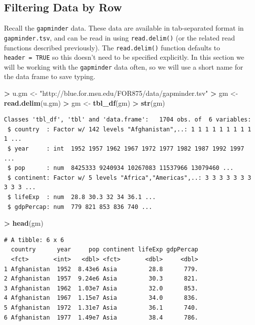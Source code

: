 \documentclass[]{krantz}
\makeatletter
\newenvironment{Shaded}{\begin{snugshade}}{\end{snugshade}}
\newcommand{\KeywordTok}[1]{\textcolor[rgb]{0.27,0.27,0.27}{\textbf{#1}}}
\newcommand{\NormalTok}[1]{#1}
\newcommand{\OperatorTok}[1]{\textcolor[rgb]{0.43,0.43,0.43}{\textbf{#1}}}
\newcommand{\StringTok}[1]{\textcolor[rgb]{0.5,0.5,0.5}{#1}}
\newenvironment{kframe}{%
\medskip{}
\setlength{\fboxsep}{.8em}
 \def\at@end@of@kframe{}%
 \ifinner\ifhmode%
  \def\at@end@of@kframe{\end{minipage}}%
  \begin{minipage}{\columnwidth}%
 \fi\fi%
 \def\FrameCommand##1{\hskip\@totalleftmargin \hskip-\fboxsep
 \colorbox{shadecolor}{##1}\hskip-\fboxsep
     \hskip-\linewidth \hskip-\@totalleftmargin \hskip\columnwidth}%
 \MakeFramed {\advance\hsize-\width
   \@totalleftmargin\z@ \linewidth\hsize
   \@setminipage}}%
 {\par\unskip\endMakeFramed%
 \at@end@of@kframe}
\renewenvironment{Shaded}{\begin{kframe}}{\end{kframe}}
\makeatother
\begin{document}
\hypertarget{filtering-data-by-row}{%
\subsection{Filtering Data by Row}\label{filtering-data-by-row}}

Recall the \texttt{gapminder} data. These data are available in tab-separated format in \texttt{gapminder.tsv}, and can be read in using \texttt{read.delim()} (or the related read functions described previously). The \texttt{read.delim()} function defaults to \texttt{header\ =\ TRUE} so this doesn't need to be specified explicitly. In this section we will be working with the \texttt{gapminder} data often, so we will use a short name for the data frame to save typing.

\begin{Shaded}
\begin{Highlighting}[]
\OperatorTok{>}\StringTok{ }\NormalTok{u.gm <-}\StringTok{ "http://blue.for.msu.edu/FOR875/data/gapminder.tsv"}
\OperatorTok{>}\StringTok{ }\NormalTok{gm <-}\StringTok{ }\KeywordTok{read.delim}\NormalTok{(u.gm)}
\OperatorTok{>}\StringTok{ }\NormalTok{gm <-}\StringTok{ }\KeywordTok{tbl_df}\NormalTok{(gm)}
\OperatorTok{>}\StringTok{ }\KeywordTok{str}\NormalTok{(gm)}
\end{Highlighting}
\end{Shaded}

\begin{verbatim}
Classes 'tbl_df', 'tbl' and 'data.frame':   1704 obs. of  6 variables:
 $ country  : Factor w/ 142 levels "Afghanistan",..: 1 1 1 1 1 1 1 1 1 1 ...
 $ year     : int  1952 1957 1962 1967 1972 1977 1982 1987 1992 1997 ...
 $ pop      : num  8425333 9240934 10267083 11537966 13079460 ...
 $ continent: Factor w/ 5 levels "Africa","Americas",..: 3 3 3 3 3 3 3 3 3 3 ...
 $ lifeExp  : num  28.8 30.3 32 34 36.1 ...
 $ gdpPercap: num  779 821 853 836 740 ...
\end{verbatim}

\begin{Shaded}
\begin{Highlighting}[]
\OperatorTok{>}\StringTok{ }\KeywordTok{head}\NormalTok{(gm)}
\end{Highlighting}
\end{Shaded}

\begin{verbatim}
# A tibble: 6 x 6
  country      year     pop continent lifeExp gdpPercap
  <fct>       <int>   <dbl> <fct>       <dbl>     <dbl>
1 Afghanistan  1952  8.43e6 Asia         28.8      779.
2 Afghanistan  1957  9.24e6 Asia         30.3      821.
3 Afghanistan  1962  1.03e7 Asia         32.0      853.
4 Afghanistan  1967  1.15e7 Asia         34.0      836.
5 Afghanistan  1972  1.31e7 Asia         36.1      740.
6 Afghanistan  1977  1.49e7 Asia         38.4      786.
\end{verbatim}
\end{document}
